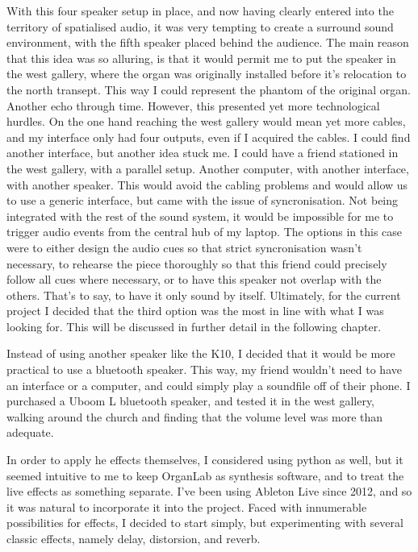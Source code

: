 \documentclass[12pt,twoside,maitrise]{dms_ks}
\theoremstyle{definition}
\begin{document}
With this four speaker setup in place, and now having clearly entered into the territory of spatialised audio, it was very tempting to create a surround sound environment, with the fifth speaker placed behind the audience. 
The main reason that this idea was so alluring, is that it would permit me to put the speaker in the west gallery, where the organ was originally installed before it's relocation to the north transept. 
This way I could represent the phantom of the original organ. 
Another echo through time. 
However, this presented yet more technological hurdles. 
On the one hand reaching the west gallery would mean yet more cables, and my interface only had four outputs, even if I acquired the cables. 
I could find another interface, but another idea stuck me. 
I could have a friend stationed in the west gallery, with a parallel setup. 
Another computer, with another interface, with another speaker. 
This would avoid the cabling problems and would allow us to use a generic interface, but came with the issue of syncronisation. 
Not being integrated with the rest of the sound system, it would be impossible for me to trigger audio events from the central hub of my laptop. 
The options in this case were to either design the audio cues so that strict syncronisation wasn't necessary, to rehearse the piece thoroughly so that this friend could precisely follow all cues where necessary, or to have this speaker not overlap with the others. 
That's to say, to have it only sound by itself. 
Ultimately, for the current project I decided that the third option was the most in line with what I was looking for. 
This will be discussed in further detail in the following chapter. 

Instead of using another speaker like the K10, I decided that it would be more practical to use a bluetooth speaker. 
This way, my friend wouldn't need to have an interface or a computer, and could simply play a soundfile off of their phone. 
I purchased a Uboom L bluetooth speaker, and tested it in the west gallery, walking around the church and finding that the volume level was more than adequate. 


In order to apply he effects themselves, I considered using python as well, but it seemed intuitive to me to keep OrganLab as synthesis software, and to treat the live effects as something separate. 
I've been using Ableton Live since 2012, and so it was natural to incorporate it into the project. 
Faced with innumerable possibilities for effects, I decided to start simply, but experimenting with several classic effects, namely delay, distorsion, and reverb. 
\end{document}
